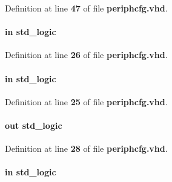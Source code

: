 Definition at line {\bf 47} of file {\bf periphcfg.\+vhd}.

\paragraph[{sclk}]{ {\bfseries \textcolor{keywordflow}{in}\textcolor{vhdlchar}{ }} {\bfseries \textcolor{comment}{std\+\_\+logic}\textcolor{vhdlchar}{ }} \hspace{0.3cm}{\ttfamily [Port]}}\label{classperiphcfg_ac922a2fc6a86b71aca5c7d49ea3bc36b}


Definition at line {\bf 26} of file {\bf periphcfg.\+vhd}.

\paragraph[{sdin}]{ {\bfseries \textcolor{keywordflow}{in}\textcolor{vhdlchar}{ }} {\bfseries \textcolor{comment}{std\+\_\+logic}\textcolor{vhdlchar}{ }} \hspace{0.3cm}{\ttfamily [Port]}}\label{classperiphcfg_a689a085f705c45ec3c2821cbe3a33b19}


Definition at line {\bf 25} of file {\bf periphcfg.\+vhd}.

\paragraph[{sdout}]{ {\bfseries \textcolor{keywordflow}{out}\textcolor{vhdlchar}{ }} {\bfseries \textcolor{comment}{std\+\_\+logic}\textcolor{vhdlchar}{ }} \hspace{0.3cm}{\ttfamily [Port]}}\label{classperiphcfg_aa9859b1193c781bb51a2e16215d90fb3}


Definition at line {\bf 28} of file {\bf periphcfg.\+vhd}.

\paragraph[{sen}]{ {\bfseries \textcolor{keywordflow}{in}\textcolor{vhdlchar}{ }} {\bfseries \textcolor{comment}{std\+\_\+logic}\textcolor{vhdlchar}{ }} \hspace{0.3cm}{\ttfamily [Port]}}\label{classperiphcfg_a5e69a30218f15bf1e4421d24cad846c0}


